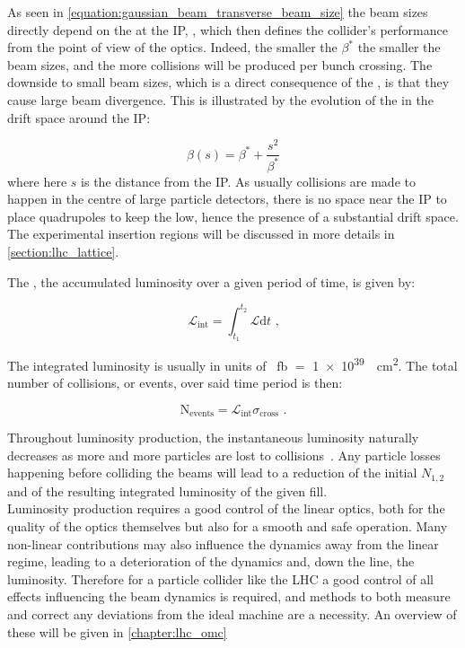 As seen in \cref{equation:gaussian_beam_transverse_beam_size} the beam sizes directly depend on the \betafunction at the IP, \betastar, which then defines the collider's performance from the point of view of the optics.
Indeed, the smaller the \(\beta^{\ast}\) the smaller the beam sizes, and the more collisions will be produced per bunch crossing. 
The downside to small beam sizes, which is a direct consequence of the , is that they cause large beam divergence.
This is illustrated by the evolution of the \betafunction in the drift space around the IP:

\begin{equation}
    \beta(s) = \beta^{\ast} + \frac{s^2}{\beta^{\ast}}
    \label{equation:betafunction_drift_space}
\end{equation}
where here \(s\) is the distance from the IP.
As usually collisions are made to happen in the centre of large particle detectors, there is no space near the IP to place quadrupoles to keep the \betafunctions low, hence the presence of a substantial drift space.
The experimental insertion regions will be discussed in more details in \cref{section:lhc_lattice}.

The , the accumulated luminosity over a given period of time, is given by:

\begin{equation}
    \mathcal{L}_{\mathrm{int}} = \int_{t_1}^{t_2} \mathcal{L} \mathrm{d}t \text{ ,}
    \label{equation:integrated_luminosity}
\end{equation}

The integrated luminosity is usually in units of \unit{\per\femto\barn} \(=\) \qty{1e39}{\per\square\centi\meter}.
The total number of collisions, or events, over said time period is then:

\begin{equation}
    \mathrm{N_{events}} = \mathcal{L}_{\mathrm{int}} \sigma_{\mathrm{cross}} \text{ .}
    \label{equation:total_number_collisions}
\end{equation}

Throughout luminosity production, the instantaneous luminosity naturally decreases as more and more particles are lost to collisions~\cite{PRES:Hostettler:LHC_Lumi_Lifetime}.
Any particle losses happening before colliding the beams will lead to a reduction of the initial \(N_{1,2}\) and of the resulting integrated luminosity of the given fill.\\

Luminosity production requires a good control of the linear optics, both for the quality of the optics themselves but also for a smooth and safe operation.
Many non-linear contributions may also influence the dynamics away from the linear regime, leading to a deterioration of the dynamics and, down the line, the luminosity.
Therefore for a particle collider like the LHC a good control of all effects influencing the beam dynamics is required, and methods to both measure and correct any deviations from the ideal machine are a necessity.
An overview of these will be given in \cref{chapter:lhc_omc}

